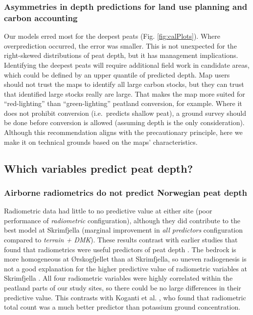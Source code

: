 \documentclass[soil, manuscript]{copernicus}
\begin{document}
\subsubsection{Asymmetries in depth predictions for land use planning and carbon accounting}

Our models erred most for the deepest peats (Fig. \ref{fig:calPlots}).
Where overprediction occurred, the error was smaller.
This is not unexpected for the right-skewed distributions of peat depth, but it has management implications.
Identifying the deepest peats will require additional field work in candidate areas, which could be defined by an upper quantile of predicted depth.
Map users should not trust the maps to identify all large carbon stocks, but they can trust that identified large stocks really are large.
That makes the map more suited for ``red-lighting'' than ``green-lighting'' peatland conversion, for example.
Where it does not prohibit conversion (i.e.~predicts shallow peat), a ground survey should be done before conversion is allowed (assuming depth is the only consideration).
Although this recommendation aligns with the precautionary principle, here we make it on technical grounds based on the maps' characteristics.

\subsection{Which variables predict peat depth?}

\subsubsection{Airborne radiometrics do not predict Norwegian peat depth}

Radiometric data had little to no predictive value at either site (poor performance of \emph{radiometric} configuration), although they did contribute to the best model at Skrimfjella (marginal improvement in \emph{all predictors} configuration compared to \emph{terrain + DMK}).
These results contrast with earlier studies that found that radiometrics were useful predictors of peat depth \citep{keaneySpatialStatisticsEstimate2013, gatisMappingUplandPeat2019, kogantiMappingPeatDepth2023}.
The bedrock is more homogeneous at Ørskogfjellet than at Skrimfjella, so uneven radiogenesis is not a good explanation for the higher predictive value of radiometric variables at Skrimfjella \citep{beamishEnvironmentalRadioactivityUK2014, reinhardtGammaraySpectrometryVersatile2019}.
All four radiometric variables were highly correlated within the peatland parts of our study sites, so there could be no large differences in their predictive value.
This contrasts with Koganti et al. \citeyearpar{kogantiMappingPeatDepth2023}, who found that radiometric total count was a much better predictor than potassium ground concentration.
\end{document}
